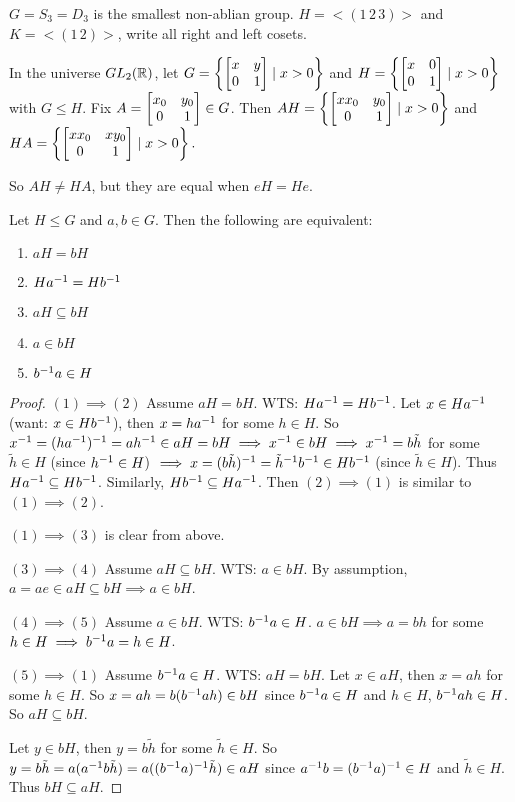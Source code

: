 \documentclass[]{article}
\begin{document}
\begin{example}
	$G = S_3 = D_3$ is the smallest non-ablian group. $H = <(1\,2\,3)>$ and $K = <(1\,2)>$, write all right and left cosets.
\end{example}
\begin{example}
	In the universe $GL_2(\mathbb{R})$, let $G = \left\{\begin{bmatrix}x&y\\0&1\end{bmatrix}\mid x>0\right\}$ and $H = \left\{\begin{bmatrix}x&0\\0&1\end{bmatrix}\mid x>0\right\}$ with $G\leq H$.
	Fix $A = \begin{bmatrix}x_0&y_0\\0&1\end{bmatrix}\in G$.
	Then
	$AH = \left\{ \begin{bmatrix}xx_0&y_0\\0&1\end{bmatrix} \mid x>0\right\}$ and $HA = \left\{ \begin{bmatrix}xx_0&xy_0\\0&1\end{bmatrix}\mid x>0\right\}.$
	
	So $AH\neq HA$, but they are equal when $eH = He$.
\end{example}

\begin{lemma}
	 Let $H\leq G$ and $a,b\in G$. Then the following are equivalent:
	\begin{enumerate}
		\item $aH = bH$
		\item $Ha^{-1} = Hb^{-1}$
		\item $aH\subseteq bH$
		\item $a\in bH$
		\item $b^{-1} a\in H$
	\end{enumerate}
\end{lemma}
\begin{proof}
	$(1)\implies(2)$ Assume $aH = bH$. WTS: $Ha^{-1} = Hb^{-1}$.
	Let $x\in Ha^{-1}$ (want: $x\in Hb^{-1}$), then $x = ha^{-1}$ for some $h\in H$.
	So $x^{-1} = (ha^{-1})^{-1} = ah^{-1} \in aH=bH\implies x^{-1} \in bH\implies x^{-1} = b\tilde{h}$ for some $\tilde{h}\in H$ (since $h^{-1}\in H$) $\implies x = (b\tilde{h})^{-1} = \tilde{h}^{-1} b^{-1} \in Hb^{-1}$ (since $\tilde{h}\in H$).
	Thus $Ha^{-1}\subseteq Hb^{-1}$. Similarly, $Hb^{-1} \subseteq Ha^{-1}$.
	Then $(2)\implies(1)$ is similar to $(1)\implies(2)$.

	$(1)\implies(3)$ is clear from above.

	$(3)\implies(4)$ Assume $aH\subseteq bH$. WTS: $a\in bH$. By assumption, $a = ae \in aH\subseteq bH \implies a\in bH$.
	
	$(4)\implies(5)$ Assume $a\in bH$. WTS: $b^{-1} a\in H$.
	$a\in bH\implies a = bh$ for some $h\in H \implies b^{-1} a = h\in H$.

	$(5)\implies(1)$ Assume $b^{-1} a\in H$. WTS: $aH = bH$.
	Let $x\in aH$, then $x = ah$ for some $h\in H$. So $x = ah = b(b^{-1} ah)\in bH$ since $b^{-1} a\in H$ and $h\in H$, $b^{-1} ah\in H$.
	So $aH\subseteq bH$.

	Let $y\in bH$, then $y = b\tilde{h}$ for some $\tilde{h}\in H$. So $y= b\tilde{h} = a(a^{-1} b\tilde{h}) = a((b^{-1} a)^{-1} \tilde{h})\in aH$ since $a^{-1} b = (b^{-1} a)^{-1}\in H$ and $\tilde{h}\in H$. Thus $bH\subseteq aH$.
\end{proof}
\end{document}
